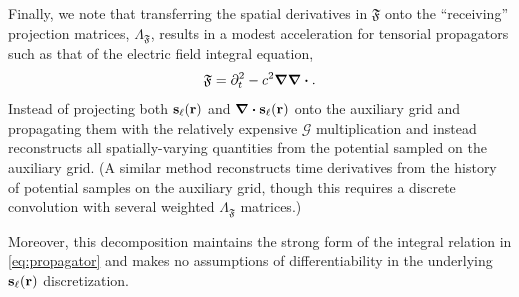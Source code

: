 Finally, we note that transferring the spatial derivatives in $\mathfrak{F}$ onto the ``receiving'' projection matrices, $\Lambda_\mathfrak{F}$, results in a modest acceleration for tensorial propagators such as that of the electric field integral equation,
\begin{equation}
  \mathfrak{F} = \partial_t^2 -c^2 \grad \grad \boldsymbol{\cdot}.
\end{equation}
Instead of projecting both $\vb{s}_\ell(\vb{r})$ and $\div{\vb{s}_\ell(\vb{r})}$ onto the auxiliary grid and propagating them with the relatively expensive $\mathcal{G}$ multiplication and instead reconstructs all spatially-varying quantities from the potential sampled on the auxiliary grid.
(A similar method reconstructs time derivatives from the history of potential samples on the auxiliary grid, though this requires a discrete convolution with several weighted $\Lambda_\mathfrak{F}$ matrices.)

Moreover, this decomposition maintains the strong form of the integral relation in \cref{eq:propagator} and makes no assumptions of differentiability in the underlying $\vb{s}_\ell(\vb{r})$ discretization.

